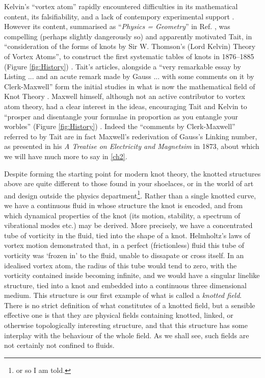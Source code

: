 Kelvin's ``vortex atom'' rapidly encountered difficulties in its mathematical content, its falsifiability, and a lack of contempory experimental support \citep{KelvinMasters}. However its content, summarised as ``\textit{Physics = Geometry}'' in Ref. \citep{KelvinAMS}, was compelling (perhaps slightly dangerously so) and apparently motivated Tait, in ``consideration of the forms of knots by Sir W. Thomson's (Lord Kelvin) Theory of Vortex Atoms'', to construct the first systematic tables of knots in 1876--1885 (Figure \ref{fig:History}) \citep{Tait1, Tait2, Tait3}. Tait's articles, alongside a ``very remarkable essay by Listing ... and an acute remark made by Gauss ... with some comments on it by Clerk-Maxwell'' \citep{Tait}form the initial studies in  what is now the mathematical field of Knot Theory \cite{Lickorish}. Maxwell himself, although not an active contributor to vortex atom theory, had a clear interest in the ideas, encouraging Tait and Kelvin to ``prosper and disentangle your formulae in proportion as you entangle your worbles'' (Figure \ref{fig:History}) \citep{MaxwellTaitLetter}. Indeed the ``comments by Clerk-Maxwell'' referred to by Tait are in fact Maxwell's rederivation of Gauss's Linking number, as presented in his \textit{A Treatise on Electricity and Magnetsim} in 1873, about which we will have much more to say in \ref{ch2}. 

Despite forming the starting point for modern knot theory, the knotted structures above are quite different to those found in your shoelaces, or in the world of art and design outside the physics department\footnote{or so I am told.}. Rather than a single knotted curve, we have a continuous fluid in whose structure the knot is encoded, and from which dynamical properties of the knot (its motion, stability, a spectrum of vibrational modes etc.) may be derived. More precisely, we have a concentrated tube of vorticity in the fluid, tied into the shape of a knot. Helmholtz's laws of vortex motion demonstrated that, in a perfect (frictionless) fluid this tube of vorticity was `frozen in' to the fluid, unable to dissapate or cross itself. In an idealised vortex atom, the radius of this tube would tend to zero, with the vorticity contained inside becoming infinite, and we would have a singular linelike structure, tied into a knot and embedded into a continuous three dimensional medium. This structure is our first example of what is called a \emph{knotted field}. There is no strict definition of what constitutes of a knotted field, but a sensible effective one is that they are physical fields containing knotted, linked, or otherwise topologically interesting structure, and that this structure has some interplay with the behaviour of the whole field. As we shall see, such fields are not certainly not confined to fluids.

